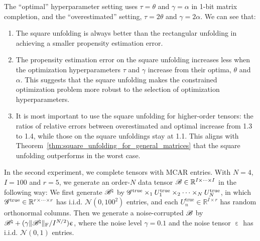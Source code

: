 \documentclass{article}
\newcommand{\T}[2][]{#1\mathscr{\MakeUppercase{#2}}}
\newcommand{\RR}{\mathbb{R}}
\newcommand{\norm}[1]{\Vert #1 \Vert}
\newcommand{\fnorm}[1]{\norm{#1}_{\mathrm{F}}}
\theoremstyle{plain}
\begin{document}
The ``optimal'' hyperparameter setting uses $\tau=\theta$ and $\gamma=\alpha$ in 1-bit matrix completion, and the ``overestimated'' setting, $\tau=2 \theta$ and $\gamma=2 \alpha$.
We can see that:
\begin{enumerate}[label=\arabic*, wide, labelwidth=!, labelindent=0pt]
	\item The square unfolding is always better than the rectangular unfolding in achieving a smaller propensity estimation error.
	\item The propensity estimation error on the square unfolding increases less when the optimization hyperparameters $\tau$ and $\gamma$ increase from their optima, $\theta$ and $\alpha$.
	This suggests that the square unfolding makes the constrained optimization problem more robust to the selection of optimization hyperparameters.
	\item It is most important to use the square unfolding for higher-order tensors: the ratios of relative errors between overestimated and optimal increase from 1.3 to 1.4, while those on the square unfoldings stay at 1.1.
	This aligns with Theorem~\ref{thm:square_unfolding_for_general_matrices} that the square unfolding outperforms in the worst case.
\end{enumerate}

In the second experiment, we complete tensors with MCAR entries.
With $N=4$, $I=100$ and $r=5$, we generate an order-$N$ data tensor $\T{B} \in \RR^{I \times \cdots \times I}$ in the following way: We first generate $\T{B}^\natural$ by $\T{G}^\mathrm{true} \times_1 U_1^\mathrm{true} \times_2 \cdots \times_N U_N^\mathrm{true}$, in which $\T{G}^\mathrm{true} \in \RR^{r \times \cdots \times r}$ has i.i.d. $\mathcal{N}(0,100^2)$ entries, and each $U_n^\mathrm{true} \in \RR^{I \times r}$ has random orthonormal columns.
Then we generate a noise-corrupted $\T{B}$ by $\T{B}^\natural + (\gamma \fnorm{\T{B}^\natural} / I^{N/2})\upepsilon$, where the noise level $\gamma = 0.1$ and the noise tensor $\upepsilon$ has i.i.d. $\mathcal{N}(0,1)$ entries.
\end{document}
